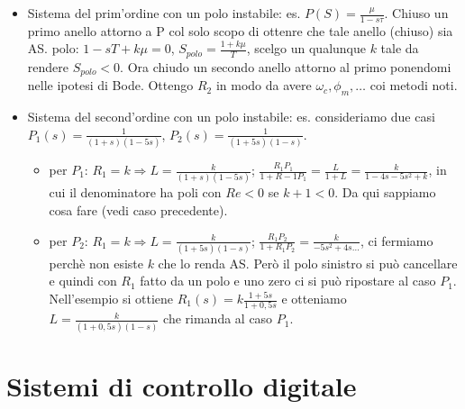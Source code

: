     \begin{itemize}
        \item Sistema del prim'ordine con un polo instabile: es. $P(S) = \frac{\mu}{1-s \tau}$.\newline
        Chiuso un primo anello attorno a P col solo scopo di ottenre che tale anello (chiuso) sia AS.\newline
        polo: $1-s T + k \mu = 0$, $S_{polo} = \frac{1 + k \mu}{T}$, scelgo un qualunque $k$ tale da rendere $S_{polo} < 0$. Ora chiudo un secondo anello attorno al primo ponendomi nelle ipotesi di Bode. Ottengo $R_2$ in modo da avere $\omega_c, \phi_m, \dots$ coi metodi noti.
        \item Sistema del second'ordine con un polo instabile: es. consideriamo due casi $P_1(s) = \frac{1}{(1+s) (1-5s)}$, $P_2(s) = \frac{1}{(1+5s) ( 1-s)}$.\newline
        \begin{itemize}
            \item per $P_1$: $R_1 = k \Rightarrow L = \frac{k}{(1+s) (1-5s)}$; $\frac{R_1 P_1}{1+R-1P_1} =  \frac{L}{1+L} = \frac{k}{1-4s-5s^2 + k}$, in cui il denominatore ha poli con $Re<0$ se $k+1<0$. Da qui sappiamo cosa fare (vedi caso precedente).
            \item per $P_2$: $R_1 = k \Rightarrow L = \frac{k}{(1+5s) (1-s)}$; $\frac{R_1 P_2}{1+ R_1 P_2} = \frac{k}{-5s^2 + 4s \dots}$, ci fermiamo perchè non esiste $k$ che lo renda AS. Però il polo sinistro si può cancellare e quindi con $R_1$ fatto da un polo e uno zero ci si può ripostare al caso $P_1$. Nell'esempio si ottiene $R_1(s) = k \frac{1+5s}{1+0,5 s}$ e otteniamo $L = \frac{k}{(1+0,5 s) (1-s)}$ che rimanda al caso $P_1$. 
        \end{itemize}
    \end{itemize}
    \newpage\section{Sistemi di controllo digitale}
